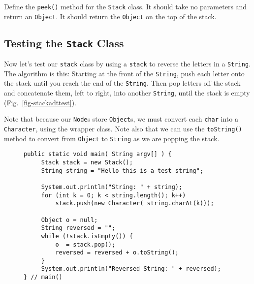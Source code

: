 

\begin{SSTUDY}

\item  Define the {\tt peek()} method for the
{\tt Stack} class.  It should
take no parameters and return an {\tt Object}. It should return the
{\tt Object} on the top of the stack.
\end{SSTUDY}


\subsection{Testing the {\tt Stack} Class}
\noindent Now let's test our {\tt stack} class by 
using a {\tt stack} to reverse the letters in a {\tt String}.  The
algorithm is this: Starting at the front of the {\tt String}, push
each letter onto the stack until you reach the end of the
{\tt String}. Then pop letters off the stack and concatenate them, left to
right, into another {\tt String}, until the stack is empty
(Fig.~\ref{fig-stackadttest}).

Note that because our {\tt Node}s store {\tt Object}s,
we must convert each {\tt char} into a {\tt Character}, using the
wrapper class.  Note also that we can use the {\tt toString()} method
to convert from {\tt Object} to {\tt String} as we are popping the
stack.

\begin{figure}[h]
\jjjprogstart
\begin{jjjlisting}
\begin{lstlisting}
public static void main( String argv[] ) {
     Stack stack = new Stack();
     String string = "Hello this is a test string";

     System.out.println("String: " + string);
     for (int k = 0; k < string.length(); k++)
         stack.push(new Character( string.charAt(k)));

     Object o = null;
     String reversed = "";
     while (!stack.isEmpty()) {
         o  = stack.pop();
         reversed = reversed + o.toString();
     }
     System.out.println("Reversed String: " + reversed);
} // main()
\end{lstlisting}
\end{jjjlisting}
\end{figure}


